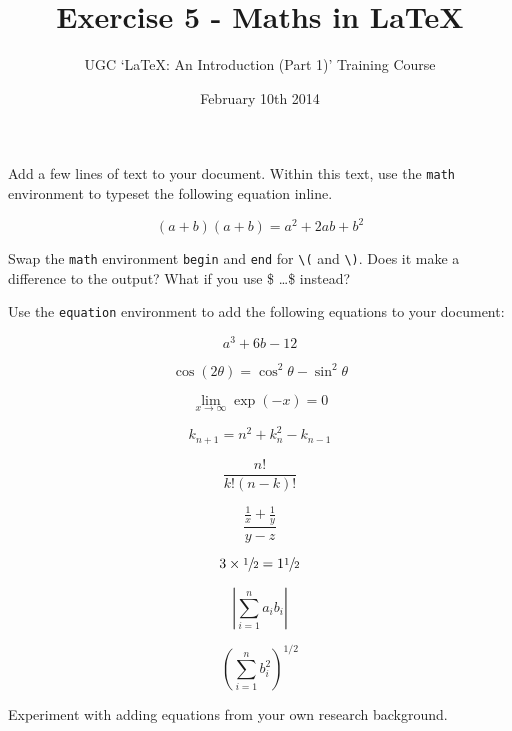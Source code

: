 \documentclass[11pt]{exam}
\title{Exercise 5 - Maths in \LaTeX}
\author{UGC `\LaTeX: An Introduction (Part 1)' Training Course}
\date{February 10th 2014}
\begin{document}
\maketitle


\vspace{0.1in}


\begin{questions}

\uplevel{}

\question
Add a few lines of text to your document. Within this text, use the \texttt{math} environment to typeset the following equation inline.

\begin{equation*}
	(a + b)(a + b) = a^2 + 2ab + b^2
\end{equation*}


\question
Swap the \texttt{math} environment \texttt{begin} and \texttt{end} for \texttt{\textbackslash(} and \texttt{\textbackslash)}. Does it make a difference to the output? What if you use \$ \ldots \$ instead? 


\question
Use the \texttt{equation} environment to add the following equations to your document:


\[
a^3 + 6b - 12
\]

\[
\cos (2\theta) = \cos^2 \theta - \sin^2 \theta
\]

\[
\lim_{x \to \infty} \exp(-x) = 0
\]

\[
k_{n+1} = n^2 + k_n^2 - k_{n-1}
\]

\[
\frac{n!}{k!(n-k)!} 
\]

\[
\frac{\frac{1}{x}+\frac{1}{y}}{y-z}
\]

\[
3\times\sfrac{1}{2}=1\sfrac{1}{2}
\]

\[
\left|\sum_{i=1}^n a_ib_i\right|
\]

\[
\left(\sum_{i=1}^n b_i^2\right)^{1/2}
\]


\question
Experiment with adding equations from your own research background. 

\end{questions}
\end{document}
